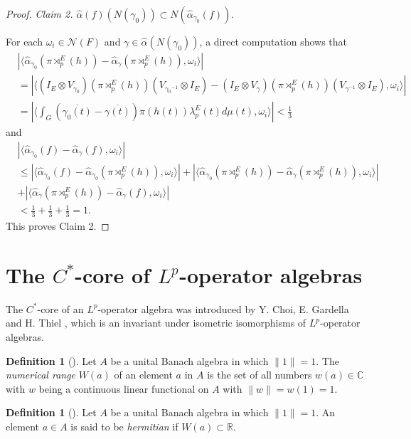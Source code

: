 \documentclass[reqno,11pt]{amsart}
\theoremstyle{plain}
\theoremstyle{definition}
\newtheorem{defn}[thm]{Definition}
\theoremstyle{remark}
\newcommand{\la}{\langle}
\newcommand{\ra}{\rangle}
\begin{document}
\begin{proof}
{\it Claim 2.} $\hat{\alpha}(f)(N(\gamma_0))\subset N(\hat{\alpha}_{\gamma_0}(f))$.

For each $\omega_i\in \mathcal{N}(F)$ and $\gamma\in \hat{\alpha}(N(\gamma_0))$, a direct computation shows that
$$\begin{aligned} &|\la \hat{\alpha}_{\gamma_0}(\pi\rtimes_p^E(h))-\hat{\alpha}_\gamma(\pi\rtimes_p^E(h)),\omega_i\ra|\\
 &=|\la(I_E\otimes V_{\gamma_0})(\pi\rtimes_p^E(h))(V_{{\gamma_0}^{-1}}\otimes I_E)-(I_E\otimes V_{\gamma})(\pi\rtimes_p^E(h))(V_{{\gamma}^{-1}}\otimes I_E),\omega_i\ra|
  \\ &=|\la \int_G(\overline{\gamma_0(t)}-\overline{\gamma(t)})\pi(h(t))\lambda_p^E(t)d\mu(t),\omega_i\ra|<\frac{1}{3}\end{aligned}$$
and
$$\begin{aligned}& |\la \hat{\alpha}_{\gamma_0}(f)- \hat{\alpha}_{\gamma}(f),\omega_i\ra| \\
&\leq|\la \hat{\alpha}_{\gamma_0}(f)- \hat{\alpha}_{\gamma_0}(\pi\rtimes_p^E(h)),\omega_i\ra|+|\la \hat{\alpha}_{\gamma_0}(\pi\rtimes_p^E(h))- \hat{\alpha}_{\gamma}(\pi\rtimes_p^E(h)),\omega_i\ra|\\
&+|\la \hat{\alpha}_{\gamma}(\pi\rtimes_p^E(h))- \hat{\alpha}_{\gamma}(f),\omega_i\ra|
  \\ &<\frac{1}{3}+\frac{1}{3}+\frac{1}{3}=1.\end{aligned}$$
This proves Claim 2.
\end{proof}



\section{The $C^*$-core of $L^p$-operator algebras}
The $C^*$-core of an $L^p$-operator algebra was introduced by Y. Choi,  E. Gardella and H. Thiel \cite{Choi and}, which is an invariant under isometric isomorphisms of $L^p$-operator algebras.

\begin{defn}[{\cite[Definition 2.6.1]{Palmer}}]
Let $A$ be a unital Banach algebra in which $\|1\|=1$. The {\it numerical range} $W(a)$ of an element $a$ in $A$ is the set of all numbers $w(a)\in \mathbb{C}$ with $w$ being a continuous linear functional on $A$ with $\|w\|=w(1)=1$.
\end{defn}

\begin{defn}[{\cite[Definition 5.5]{Lp AF}}]
Let $A$ be a unital Banach algebra in which $\|1\|=1$.
An element $a\in A$ is said to be {\it hermitian} if $W(a)\subset \mathbb{R}$.
\end{defn}
\end{document}
